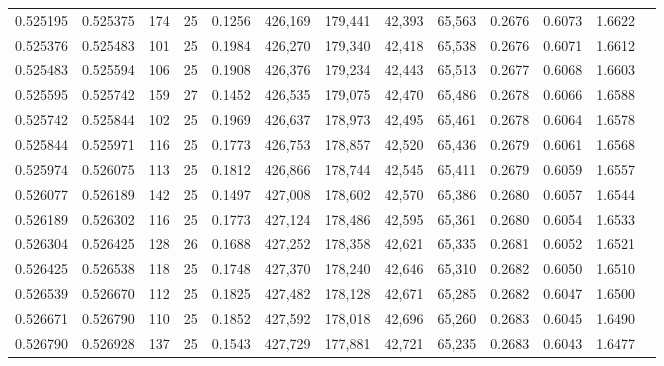 \begin{tabular}{rrrrrrrrrrrrr}
0.525195 & 0.525375 &   174 &  25 &                                     0.1256 & 426,169 & 179,441 &  42,393 &  65,563 & 0.2676 & 0.6073 & 1.6622 \\
0.525376 & 0.525483 &   101 &  25 &                                     0.1984 & 426,270 & 179,340 &  42,418 &  65,538 & 0.2676 & 0.6071 & 1.6612 \\
0.525483 & 0.525594 &   106 &  25 &                                     0.1908 & 426,376 & 179,234 &  42,443 &  65,513 & 0.2677 & 0.6068 & 1.6603 \\
0.525595 & 0.525742 &   159 &  27 &                                     0.1452 & 426,535 & 179,075 &  42,470 &  65,486 & 0.2678 & 0.6066 & 1.6588 \\
0.525742 & 0.525844 &   102 &  25 &                                     0.1969 & 426,637 & 178,973 &  42,495 &  65,461 & 0.2678 & 0.6064 & 1.6578 \\
0.525844 & 0.525971 &   116 &  25 &                                     0.1773 & 426,753 & 178,857 &  42,520 &  65,436 & 0.2679 & 0.6061 & 1.6568 \\
0.525974 & 0.526075 &   113 &  25 &                                     0.1812 & 426,866 & 178,744 &  42,545 &  65,411 & 0.2679 & 0.6059 & 1.6557 \\
0.526077 & 0.526189 &   142 &  25 &                                     0.1497 & 427,008 & 178,602 &  42,570 &  65,386 & 0.2680 & 0.6057 & 1.6544 \\
0.526189 & 0.526302 &   116 &  25 &                                     0.1773 & 427,124 & 178,486 &  42,595 &  65,361 & 0.2680 & 0.6054 & 1.6533 \\
0.526304 & 0.526425 &   128 &  26 &                                     0.1688 & 427,252 & 178,358 &  42,621 &  65,335 & 0.2681 & 0.6052 & 1.6521 \\
0.526425 & 0.526538 &   118 &  25 &                                     0.1748 & 427,370 & 178,240 &  42,646 &  65,310 & 0.2682 & 0.6050 & 1.6510 \\
0.526539 & 0.526670 &   112 &  25 &                                     0.1825 & 427,482 & 178,128 &  42,671 &  65,285 & 0.2682 & 0.6047 & 1.6500 \\
0.526671 & 0.526790 &   110 &  25 &                                     0.1852 & 427,592 & 178,018 &  42,696 &  65,260 & 0.2683 & 0.6045 & 1.6490 \\
0.526790 & 0.526928 &   137 &  25 &                                     0.1543 & 427,729 & 177,881 &  42,721 &  65,235 & 0.2683 & 0.6043 & 1.6477 \\

\end{tabular}
